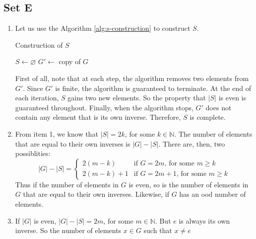 \documentclass{article}
\let\emptyset\varnothing
\begin{document}
\subsection*{Set E}
\begin{enumerate}
    \item Let us use the Algorithm \ref{alg:s-construction} to construct $S$.
        \begin{algorithm}[H]
            \caption{Construction of $S$}\label{alg:s-construction}
            \begin{algorithmic}[1]
                \Procedure{}{}
                \State $S \leftarrow \emptyset$
                \State $G' \leftarrow$ copy of $G$
                \EndWhile
                \EndProcedure
            \end{algorithmic}
        \end{algorithm}
        First of all, note that at each step, the algorithm removes two elements from $G'$. Since $G'$ is finite, the algorithm is guaranteed to terminate.
        At the end of each iteration, $S$ gains two new elements. So the property that $|S|$ is even is guaranteed throughout. Finally, when the algorithm stops,
        $G'$ does not contain any element that is its own inverse. Therefore, $S$ is complete.
    \item From item 1, we know that $|S| = 2k$, for some $k \in \mathbb{N}$. The number of elements that are equal to their own inverses is $|G| - |S|$. There are, then,
        two possiblities:
        \begin{equation*}
            |G| - |S| =
            \begin{cases}
                2(m - k)     & \text{if $G = 2m$, for some $m \geqslant k$}\\ 
                2(m - k) + 1 & \text{if $G = 2m + 1$, for some $m \geqslant k$}
            \end{cases}
        \end{equation*}
        Thus if the number of elements in $G$ is even, so is the number of elements in $G$ that are equal to their own inverses. Likewise, if $G$ has an ood number of elements.
    \item If $|G|$ is even, $|G| - |S| = 2m$, for some $m \in \mathbb{N}$. But $e$ is always its own inverse. So the number of elements $x \in G$ such that $x \ne e$

\end{enumerate}
\end{document}
